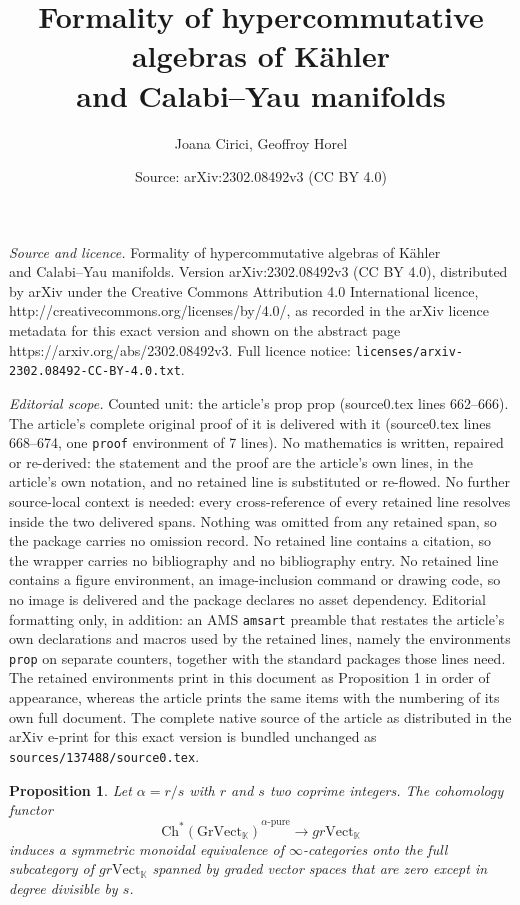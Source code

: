 \documentclass[10pt,a4paper]{amsart}
\title{Formality of hypercommutative algebras of Kähler\\ and Calabi--Yau manifolds}
\author{Joana Cirici, Geoffroy Horel}
\date{Source: arXiv:2302.08492v3 (CC BY 4.0)}
\newtheorem{prop}{Proposition}
\newcommand{\KK}{\mathbb{K}}
\newcommand{\Vect}{\mathrm{Vect}}
\newcommand{\ch}[1]{\mathrm{Ch^*({#1})}}
\begin{document}
\maketitle

\noindent\emph{Source and licence.} Formality of hypercommutative algebras of Kähler\\ and Calabi--Yau manifolds. Version arXiv:2302.08492v3 (CC BY 4.0), distributed by arXiv under the Creative Commons Attribution 4.0 International licence, http://creativecommons.org/licenses/by/4.0/, as recorded in the arXiv licence metadata for this exact version and shown on the abstract page https://arxiv.org/abs/2302.08492v3. Full licence notice: \texttt{licenses/arxiv-2302.08492-CC-BY-4.0.txt}.\par\smallskip

\noindent\textit{Editorial scope.} Counted unit: the article's prop prop (source0.tex lines 662--666). The article's complete original proof of it is delivered with it (source0.tex lines 668--674, one \texttt{proof} environment of 7 lines). No mathematics is written, repaired or re-derived: the statement and the proof are the article's own lines, in the article's own notation, and no retained line is substituted or re-flowed.  No further source-local context is needed: every cross-reference of every retained line resolves inside the two delivered spans.  Nothing was omitted from any retained span, so the package carries no omission record.  No retained line contains a citation, so the wrapper carries no bibliography and no bibliography entry.  No retained line contains a figure environment, an image-inclusion command or drawing code, so no image is delivered and the package declares no asset dependency.  Editorial formatting only, in addition: an AMS \texttt{amsart} preamble that restates the article's own declarations and macros used by the retained lines, namely the environments \texttt{prop} on separate counters, together with the standard packages those lines need.  The retained environments print in this document as Proposition 1 in order of appearance, whereas the article prints the same items with the numbering of its own full document.  The complete native source of the article as distributed in the arXiv e-print for this exact version is bundled unchanged as \texttt{sources/137488/source0.tex}.
\begin{prop}
Let $\alpha=r/s$ with $r$ and $s$ two coprime integers. The cohomology functor
\[\ch{Gr\Vect_\KK}^{\alpha\text{-pure}}\to gr\Vect_\KK\]
induces a symmetric monoidal equivalence of $\infty$-categories onto the full subcategory of $gr\Vect_\KK$ spanned by graded vector spaces that are zero except in degree divisible by $s$.
\end{prop}
\end{document}
